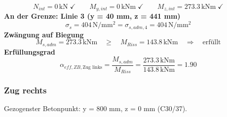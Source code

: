 \documentclass[11pt,a4paper]{article}
\begin{document}
\begin{equation*}
N_{int} = 0\,\mathrm{kN} \;\checkmark \qquad M_{y,int} = 0\,\mathrm{kNm} \;\checkmark \qquad M_{z,int} = 273.3\,\mathrm{kNm} \;\checkmark
\end{equation*}
\noindent\textbf{An der Grenze: Linie 3 (y = 40 mm, z = 441 mm)}
\begin{equation*}
\sigma_s = 404\,\mathrm{N}/\mathrm{mm}^{2} = \sigma_{s,adm,4} = 404\,\mathrm{N}/\mathrm{mm}^{2}
\end{equation*}
\noindent\textbf{Zwängung auf Biegung}
\begin{equation*}
M_{s,adm} = 273.3\,\mathrm{kNm} \quad \ge \quad M_{Riss} = 143.8\,\mathrm{kNm} \quad \Rightarrow \quad \text{erfüllt}
\end{equation*}
\noindent\textbf{Erfüllungsgrad}
\begin{equation*}
\alpha_{eff,ZB,\text{Zug links}} = \frac{M_{s,adm}}{M_{Riss}} = \frac{273.3\,\mathrm{kNm}}{143.8\,\mathrm{kNm}} = 1.90
\end{equation*}
\subsubsection{Zug rechts}
Gezogenster Betonpunkt: y = 800 mm, z = 0 mm (C30/37).
\end{document}
